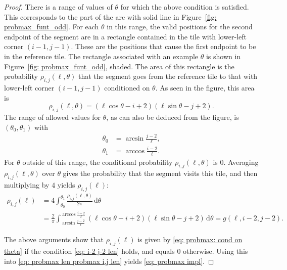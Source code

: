 \documentclass[12pt, a4paper]{article}
\newcommand{\diff}{\mathrm d}
\newcommand{\probmax}{\rho} %
\newcommand{\len}{\ell} %
\begin{document}
\begin{proof}
There is a range of values of $\theta$ for which the above condition is satisfied. This corresponds to the part of the arc with solid line in Figure~\ref{fig: probmax_funt_odd}. For each $\theta$ in this range, the valid positions for the second endpoint of the segment are in a rectangle contained in the tile with lower-left corner $(i-1,j-1)$. These are the positions that cause the first endpoint to be in the reference tile. The rectangle associated with an example $\theta$ is shown in Figure~\ref{fig: probmax_funt_odd}, shaded. The area of this rectangle is the probability $\probmax_{i, j}(\len,\theta)$ that the segment goes from the reference tile to that with lower-left corner $(i-1,j-1)$ conditioned on $\theta$. As seen in the figure, this area is
\begin{equation}
\label{eq: probmax: probmax theta odd}
\probmax_{i, j}(\len, \theta) = \left(\len\cos\theta - i+2\right) \left(\len\sin\theta - j + 2\right).
\end{equation}
The range of allowed values for $\theta$, as can also be deduced from the figure, is $(\theta_0, \theta_1)$ with
\begin{align}
\label{eq: odd theta 0}
\theta_0 & = \arcsin\frac{j-2}{\len}, \\
\label{eq: odd theta 1}
\theta_1 & = \arccos\frac{i-2}{\len}.
\end{align}
For $\theta$ outside of this range, the conditional probability $\probmax_{i, j}(\len, \theta)$ is $0$. Averaging $\probmax_{i, j}(\len, \theta)$ over $\theta$ gives the probability that the segment visits this tile, and then multiplying by $4$ yields $\probmax_{i,j}(\len)$:
\begin{equation}
\begin{split}
\label{eq: probmax: cond on theta}
\probmax_{i,j}(\len) &= 4 \int_{\theta_0}^{\theta_1} \frac{\probmax_{i, j}(\len, \theta)}{2\pi} \, \diff \theta \\
&= \frac 2 {\pi} \int_{\arcsin\frac{j-2}{\len}}^{\arccos\frac{i-2}{\len}} \left( \len\cos\theta - i + 2 \right)  \left( \len\sin\theta - j + 2 \right) \, \diff \theta
= g( \len, i-2, j-2).
\end{split}
\end{equation}

The above arguments show that $\probmax_{i,j}(\len)$ is given by \eqref{eq: probmax: cond on theta} if the condition \eqref{eq: i-2 j-2 len} holds, and equals $0$ otherwise. Using this into \eqref{eq: probmax len probmax i,j len} yields \eqref{eq: probmax impl}.


\end{proof}
\end{document}

